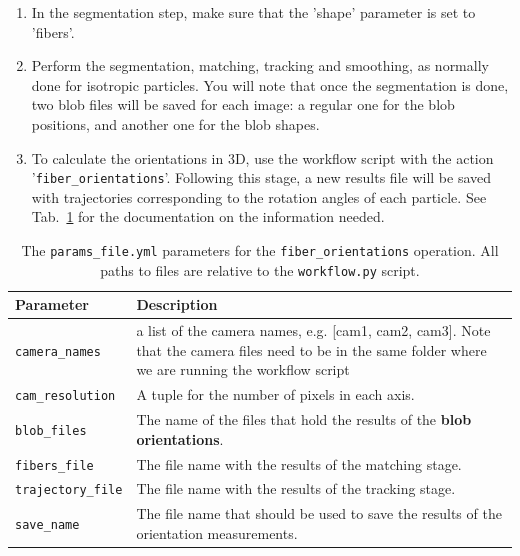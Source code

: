 \documentclass[10pt,a4paper]{article}
\begin{document}
\begin{enumerate}
	\item In the segmentation step, make sure that the 
	'shape' parameter is set to 'fibers'.
	
	\item Perform the segmentation, matching, tracking and smoothing, as normally done for isotropic particles. You will note that once the segmentation is done, two blob files will be saved for each image: a regular one for the blob positions, and another one for the blob shapes. 
	
	\item To calculate the orientations in 3D, use the workflow script with the action '\texttt{fiber\_orientations}'. Following this stage, a new results file will be saved with trajectories corresponding to the rotation angles of each particle. See Tab.~\ref{tab:fibers} for the documentation on the information needed. 
\end{enumerate}  





%
\begin{table}[!ht]
	\centering
	\caption{The \texttt{params\_file.yml} parameters for the \texttt{fiber\_orientations} operation. All paths to files are relative to the \texttt{workflow.py} script. \label{tab:fibers}}
	\begin{tabular}{l m{12cm}}
		\hline
		Parameter & Description\\[.2cm]
		\hline
		\texttt{camera\_names} & a list of the camera names, e.g. [cam1, cam2, cam3]. Note that the camera files need to be in the same folder where we are running the workflow script\\[.2cm]
		\texttt{cam\_resolution} & A tuple for the number of pixels in each axis. \\[.2cm]
		\texttt{blob\_files} & The name of the files that hold the results of the \textbf{blob orientations}. \\[.2cm]
		\texttt{fibers\_file} & The file name with the results of the matching stage. \\[.2cm]
		\texttt{trajectory\_file} & The file name with the results of the tracking stage. \\[.2cm]
		\texttt{save\_name} & The file name that should be used to save the results of the orientation measurements. \\[.2cm]
		\hline
	\end{tabular}
\end{table}
\end{document}
